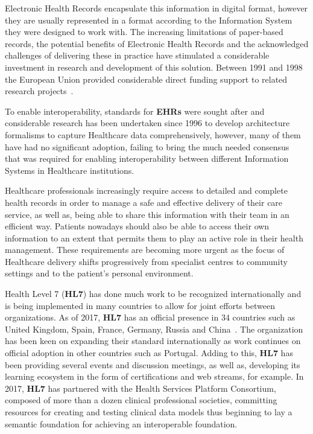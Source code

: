 Electronic Health Records encapsulate this information in digital format,
however they are usually represented in a format according to the Information
System they were designed to work with. The increasing limitations of
paper-based records, the potential benefits of Electronic Health Records and
the acknowledged challenges of delivering these in practice have stimulated a
considerable investment in research and development of this solution.  Between
1991 and 1998 the European Union provided considerable direct funding support
to related research projects~\cite{Kalra2006}.

To enable interoperability, standards for \textbf{EHRs} were sought after and
considerable research has been undertaken since 1996 to develop architecture
formalisms to capture Healthcare data comprehensively, however, many of them
have had no significant adoption, failing to bring the much needed
consensus~\cite{Eichelberg2006} that was required for enabling interoperability
between different Information Systems in Healthcare institutions. 

Healthcare professionals increasingly require access to detailed and complete
health records in order to manage a safe and effective delivery of their care
service, as well as, being able to share this information with their team in an
efficient way. Patients nowadays should also be able to access their own
information to an extent that permits them to play an active role in their
health management. These requirements are becoming more urgent as the focus of
Healthcare delivery shifts progressively from specialist centres to community
settings and to the patient’s personal environment.

Health Level 7 (\textbf{HL7}) has done much work to be recognized
internationally and is being implemented in many countries to allow for joint
efforts between organizations. As of 2017, \textbf{HL7} has an official
presence in 34 countries such as United Kingdom, Spain, France, Germany, Russia
and China~\cite{HL7Anual2016}. The organization has been keen on expanding
their standard internationally as work continues on official adoption in other
countries such as Portugal. Adding to this, \textbf{HL7} has been providing
several events and discussion meetings, as well as, developing its learning
ecosystem in the form of certifications and web streams, for example. In 2017,
\textbf{HL7} has partnered with the Health Services Platform Consortium,
composed of more than a dozen clinical professional societies, committing
resources for creating and testing clinical data models thus beginning to lay a
semantic foundation for achieving an interoperable foundation.

